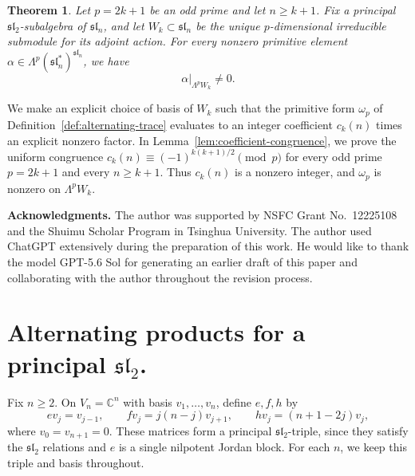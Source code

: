 \documentclass[12pt]{article}
\newtheorem{theorem}{Theorem}[section]
\theoremstyle{definition}
\theoremstyle{remark}
\newcommand{\C}{\mathbb C}
\begin{document}
\begin{theorem}\label{thm:main}
Let $p=2k+1$ be an odd prime and let $n\geq k+1$.
Fix a principal $\mathfrak{sl}_2$-subalgebra of $\mathfrak{sl}_n$, and
let $W_k\subset\mathfrak{sl}_n$ be the unique $p$-dimensional
irreducible submodule for its adjoint action. For every nonzero
primitive element
$\alpha\in\Lambda^p(\mathfrak{sl}_n^*)^{\mathfrak{sl}_n}$, we have
\[
 \left.\alpha\right|_{\Lambda^pW_k}\neq0.
\]
\end{theorem}

We make an explicit choice of basis of $W_k$ such that the primitive
form $\omega_p$ of Definition~\ref{def:alternating-trace} evaluates to
an integer coefficient $c_k(n)$ times an explicit nonzero factor.
In Lemma~\ref{lem:coefficient-congruence}, we prove the uniform congruence
$c_k(n)\equiv(-1)^{k(k+1)/2}\pmod p$ for every odd prime $p=2k+1$
and every $n\geq k+1$. Thus $c_k(n)$ is a nonzero integer, and
$\omega_p$ is nonzero on $\Lambda^pW_k$.

\vspace{1em}
\noindent\textbf{Acknowledgments.}
The author was supported by NSFC Grant No.~12225108 and the Shuimu Scholar
Program in Tsinghua University. The author used ChatGPT extensively during
the preparation of this work. He would like to thank the model GPT-5.6 Sol
for generating an earlier draft of this paper and collaborating with the
author throughout the revision process.

\setlength{\abovedisplayskip}{0.5em plus 0.25em minus 0.25em}
\setlength{\belowdisplayskip}{0.5em plus 0.25em minus 0.25em}
\setlength{\belowdisplayshortskip}{0.25em plus 0.25em minus 0.25em}

\section{Alternating products for a principal \texorpdfstring{$\mathfrak{sl}_2$}{sl2}.}\label{sec:symmetric}

Fix $n\geq2$. On $V_n=\C^n$ with basis $v_1,\ldots,v_n$, define
$e,f,h$ by
\begin{equation}\label{eq:basis-action}
 ev_j=v_{j-1},\qquad fv_j=j(n-j)v_{j+1},\qquad
 hv_j=(n+1-2j)v_j,
\end{equation}
where $v_0=v_{n+1}=0$. These matrices form a principal
$\mathfrak{sl}_2$-triple, since they satisfy the $\mathfrak{sl}_2$ relations
and $e$ is a single nilpotent Jordan block. For each $n$, we keep
this triple and basis throughout.
\end{document}
